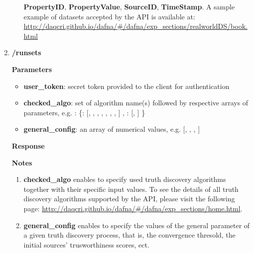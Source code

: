 \documentclass[a4paper,10pt]{scrartcl}
\newcommand{\lamine}[1]{\textcolor{blue}{#1}}
\begin{document}
\begin{enumerate}
\begin{enumerate}
 \textbf{PropertyID}, \textbf{PropertyValue}, \textbf{SourceID}, \textbf{TimeStamp}. 
 A sample example of datasets accepted by the API is available at:\\
 \href{http://daqcri.github.io/dafna/\#/dafna/exp\_sections/realworldDS/book.html}{\small{http://daqcri.github.io/dafna/\#/dafna/exp\_sections/realworldDS/book.html}}
\end{enumerate}
%
 \item \textbf{/runsets}
\textbf{Parameters}
\begin{itemize}
 \item \textbf{user\_token}: secret token provided to the client for authentication 
 \item  \textbf{checked\_algo}: set of algorithm name(s) followed by respective arrays of parameters, e.g. : \{: [, , , , , , , ] , : [, ] \}
 \item \textbf{general\_config}: an array of numerical values, e.g. [, , , ]
\end{itemize}
\textbf{Response}
\textbf{Notes}
\begin{enumerate}
 \item \textbf{checked\_algo} enables to specify used truth discovery algorithms together with their specific input values. To see the 
 details of all truth discovery algorithms supported by the API, please visit the following page: \href{http://daqcri.github.io/dafna/\#/dafna/exp\_sections/home.html}{http://daqcri.github.io/dafna/\#/dafna/exp\_sections/home.html}.
\item \textbf{general\_config} enables to specify the values of the general parameter of a given truth discovery process, that is, the convergence thresold, the initial sources' trusworthiness scores, ect.
 \end{enumerate}
\end{enumerate}
\end{document}
